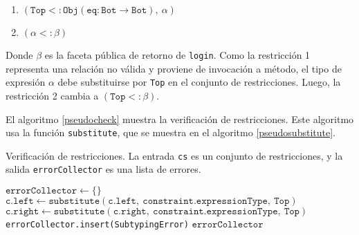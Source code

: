 \begin{enumerate}
  \item $(\mathtt{Top <: Obj(eq: Bot \rightarrow Bot),\ \alpha})$
  \item $(\mathtt{\alpha <: \beta})$
\end{enumerate}

Donde $\beta$ es la faceta pública de retorno de \texttt{login}. Como la restricción 1 representa una relación no válida y proviene de invocación a método, el tipo de expresión $\alpha$ debe substituirse por \texttt{Top} en el conjunto de restricciones. Luego, la restricción 2 cambia a $(\mathtt{Top <: \beta})$.

El algoritmo \ref{pseudocheck} muestra la verificación de restricciones. Este algoritmo usa la función \texttt{substitute}, que se muestra en el algoritmo \ref{pseudosubstitute}.
\begin{algorithm}\captionsetup{labelsep=newline}
  \centering
  \caption{Verificación de restricciones. La entrada \texttt{cs} es un conjunto de restricciones, y la salida \texttt{errorCollector} es una lista de errores.}
  \label{pseudocheck}
    \begin{algorithmic}[1]
          \State $\mathtt{errorCollector\gets \{\}}$
                \State $\mathtt{c.left\gets substitute(c.left,\ constraint.expressionType,\ Top)}$
                \State $\mathtt{c.right\gets substitute(c.right,\ constraint.expressionType,\ Top)}$
              \EndFor
              \State \texttt{errorCollector.insert(SubtypingError)}
            \EndIf
          \EndFor
          \State \Return $\mathtt{errorCollector}$
      \EndFunction
    \end{algorithmic}
\end{algorithm}


